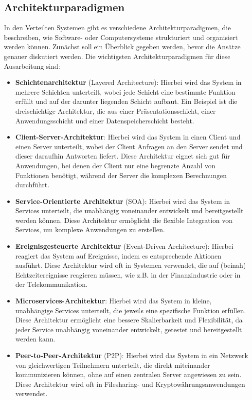 \documentclass[../vs-script-first-v01.tex]{subfiles}
\begin{document}
\label{Woche03}\subsection{Architekturparadigmen}

In den Verteilten Systemen gibt es verschiedene Architekturparadigmen, die beschreiben, wie Software- oder Computersysteme strukturiert und organisiert werden können. Zunächst soll ein Überblick gegeben werden, bevor die Ansätze genauer diskutiert werden. Die wichtigsten Architekturparadigmen für diese Ausarbeitung sind:
\begin{itemize}  
\item \textbf{Schichtenarchitektur} (Layered Architecture): Hierbei wird das System in mehrere Schichten unterteilt, wobei jede Schicht eine bestimmte Funktion erfüllt und auf der darunter liegenden Schicht aufbaut. Ein Beispiel ist die dreischichtige Architektur, die aus einer Präsentationsschicht, einer Anwendungsschicht und einer Datenspeicherschicht besteht.

\item \textbf{Client-Server-Architektur}: Hierbei wird das System in einen Client und einen Server unterteilt, wobei der Client Anfragen an den Server sendet und dieser daraufhin Antworten liefert. Diese Architektur eignet sich gut für Anwendungen, bei denen der Client nur eine begrenzte Anzahl von Funktionen benötigt, während der Server die komplexen Berechnungen durchführt.

\item \textbf{Service-Orientierte Architektur} (SOA): Hierbei wird das System in Services unterteilt, die unabhängig voneinander entwickelt und bereitgestellt werden können. Diese Architektur ermöglicht die flexible Integration von Services, um komplexe Anwendungen zu erstellen.

\item \textbf{Ereignisgesteuerte Architektur} (Event-Driven Architecture): Hierbei reagiert das System auf Ereignisse, indem es entsprechende Aktionen ausführt. Diese Architektur wird oft in Systemen verwendet, die auf (beinah) Echtzeitereignisse reagieren müssen, wie z.B. in der Finanzindustrie oder in der Telekommunikation.

\item \textbf{Microservices-Architektur}: Hierbei wird das System in kleine, unabhängige Services unterteilt, die jeweils eine spezifische Funktion erfüllen. Diese Architektur ermöglicht eine bessere Skalierbarkeit und Flexibilität, da jeder Service unabhängig voneinander entwickelt, getestet und bereitgestellt werden kann.

\item \textbf{Peer-to-Peer-Architektur} (P2P): Hierbei wird das System in ein Netzwerk von gleichwertigen Teilnehmern unterteilt, die direkt miteinander kommunizieren können, ohne auf einen zentralen Server angewiesen zu sein. Diese Architektur wird oft in Filesharing- und Kryptowährungsanwendungen verwendet.
\end{itemize}  
\end{document}
